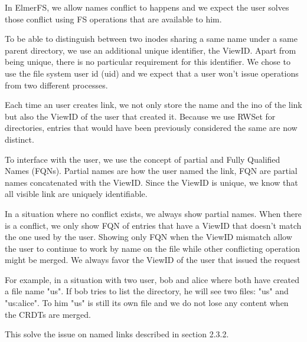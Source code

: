 \documentclass[sigplan, 10pt]{acmart}
\begin{document}
In ElmerFS, we allow names conflict to happens and we expect the user solves
those conflict using FS operations that are available to him.

To be able to distinguish between two inodes sharing a same name under a same
parent directory, we use an additional unique identifier, the ViewID.
Apart from being unique, there is no particular requirement for this
identifier. We chose to use the file system user id (uid) and we expect that a
user won't issue operations from two different processes.

Each time an user creates link, we not only store the name and the ino of the
link but also the ViewID of the user that created it. Because we use RWSet
for directories, entries that would have been previously considered
the same are now distinct.

To interface with the user, we use the concept of partial and Fully Qualified
Names (FQNs). Partial names are how the user named the link, FQN are partial
names concatenated with the ViewID. Since the ViewID is unique,
we know that all visible link are uniquely identifiable.

In a situation where no conflict exists, we always show partial names. When
there is a conflict, we only show FQN of entries that have a ViewID that
doesn't match the one used by the user. Showing only FQN when the ViewID
mismatch allow the user to continue to work by name on the file while other
conflicting operation might be merged. We always favor the ViewID of the user that issued the request

For example, in a situation with two user, bob and alice where both have
created a file name "us". If bob tries to list the directory, he will see two
files: "us" and "us:alice". To him "us" is still its own file and we do not
lose any content when the CRDTs are merged.

This solve the issue on named links described in section 2.3.2.



\end{document}
